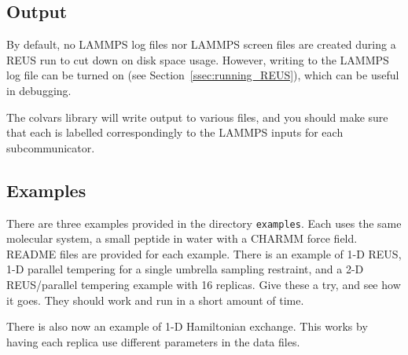 \documentclass[10pt]{article}
\begin{document}
\subsection{Output}

By default, no LAMMPS log files nor LAMMPS screen files are created during a REUS 
run to cut down on disk space usage. However, writing to the LAMMPS log file can 
be turned on (see Section~\ref{ssec:running_REUS}), which can be useful in debugging.

The colvars library will write output to various files, and you should make sure
that each is labelled correspondingly to the LAMMPS inputs for each subcommunicator.

\subsection{Examples}

There are three examples provided in the directory \texttt{examples}. Each uses the
same molecular system, a small peptide in water with a CHARMM force field. README
files are provided for each example. There is an example of 1-D REUS, 1-D parallel
tempering for a single umbrella sampling restraint, and a 2-D REUS/parallel tempering
example with 16 replicas. Give these a try, and see how it goes. They should work and run in
a short amount of time.

There is also now an example of 1-D Hamiltonian exchange. This works by having each
replica use different parameters in the data files.
\end{document}

